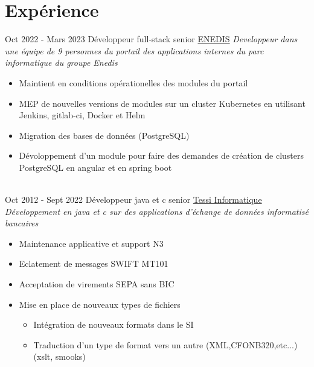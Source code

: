 \documentclass[letterpaper]{twentysecondcv} %
\begin{document}
\makeprofile %
 

\section{Expérience}

\begin{twenty} %
    \twentyitem
   		{Oct 2022 -}
		{Mars 2023}
        {Développeur full-stack senior}
        {\href{https://www.enedis.fr}{ENEDIS}}
        {\textit{Developpeur dans une équipe de 9 personnes du portail des applications internes du parc informatique du groupe Enedis}}
        {
       {\begin{itemize}
		\item Maintient en conditions opérationelles des modules du portail
		\item MEP de nouvelles versions de modules sur un cluster Kubernetes en utilisant Jenkins, gitlab-ci, Docker et Helm  
                \item Migration des bases de données (PostgreSQL)
                \item Dévoloppement d'un module pour faire des demandes de création de clusters PostgreSQL en angular et en spring boot
	 \end{itemize}}
        }
     \\
\twentyitem
    	{Oct 2012 -}
		{Sept 2022}
        {Développeur java et c senior}
        {\href{http://www.tessi.fr/}{Tessi Informatique}}
        {\textit{Développement en java et c sur des applications d’échange de données informatisé  bancaires}}
        {\begin{itemize}
        \item Maintenance applicative et support N3
        \item Eclatement de messages SWIFT MT101
        \item Acceptation de virements SEPA sans BIC
        \item Mise en place de nouveaux types de fichiers
      	{\begin{itemize}
		\item Intégration de nouveaux formats dans le SI
		\item Traduction d'un type de format vers un autre (XML,CFONB320,etc...) (xslt, smooks)

\end{itemize}}
\end{itemize}}
\end{twenty}
\end{document}
